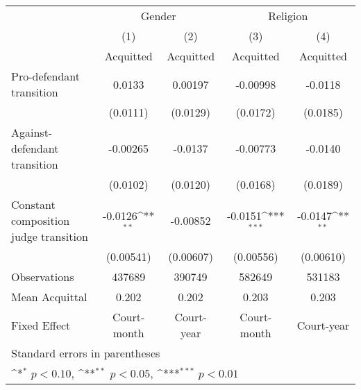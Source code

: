 {
\def\sym#1{\ifmmode^{#1}\else\(^{#1}\)\fi}
\begin{tabular}{l*{4}{c}}
\hline\hline
                    &\multicolumn{2}{c}{Gender}                 &\multicolumn{2}{c}{Religion}               \\\cmidrule(lr){2-3}\cmidrule(lr){4-5}
                    &\multicolumn{1}{c}{(1)}&\multicolumn{1}{c}{(2)}&\multicolumn{1}{c}{(3)}&\multicolumn{1}{c}{(4)}\\
                    &\multicolumn{1}{c}{Acquitted}&\multicolumn{1}{c}{Acquitted}&\multicolumn{1}{c}{Acquitted}&\multicolumn{1}{c}{Acquitted}\\
\hline
Pro-defendant transition&      0.0133         &     0.00197         &    -0.00998         &     -0.0118         \\
                    &    (0.0111)         &    (0.0129)         &    (0.0172)         &    (0.0185)         \\
Against-defendant transition&    -0.00265         &     -0.0137         &    -0.00773         &     -0.0140         \\
                    &    (0.0102)         &    (0.0120)         &    (0.0168)         &    (0.0189)         \\
Constant composition judge transition&     -0.0126\sym{**} &    -0.00852         &     -0.0151\sym{***}&     -0.0147\sym{**} \\
                    &   (0.00541)         &   (0.00607)         &   (0.00556)         &   (0.00610)         \\
\hline
Observations        &      437689         &      390749         &      582649         &      531183         \\
Mean Acquittal      &       0.202         &       0.202         &       0.203         &       0.203         \\
Fixed Effect        & Court-month         &  Court-year         & Court-month         &  Court-year         \\
\hline\hline
\multicolumn{5}{l}{\footnotesize Standard errors in parentheses}\\
\multicolumn{5}{l}{\footnotesize \sym{*} \(p<0.10\), \sym{**} \(p<0.05\), \sym{***} \(p<0.01\)}\\
\end{tabular}
}
